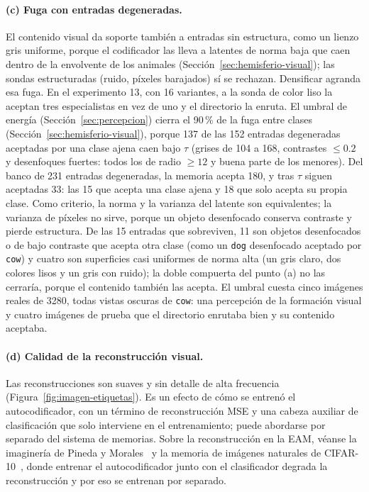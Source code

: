 \paragraph{(c) Fuga con entradas degeneradas.}
El contenido visual da soporte también a entradas sin estructura, como un lienzo gris
uniforme, porque el codificador las lleva a latentes de norma baja que caen dentro de la
envolvente de los animales (Sección~\ref{sec:hemisferio-visual}); las sondas
estructuradas (ruido, píxeles barajados) sí se rechazan.
Densificar agranda esa fuga.
En el experimento 13, con 16 variantes, a la sonda de color liso la aceptan tres
especialistas en vez de uno y el directorio la enruta.
El umbral de energía (Sección~\ref{sec:percepcion}) cierra el 90\,\% de la fuga entre
clases (Sección~\ref{sec:hemisferio-visual}), porque 137 de las 152 entradas
degeneradas aceptadas por una clase ajena caen bajo $\tau$ (grises de 104 a 168,
contrastes $\leq 0.2$ y desenfoques
fuertes: todos los de radio $\geq 12$ y buena parte de los menores).
Del banco de 231 entradas degeneradas, la memoria acepta 180, y tras $\tau$ siguen
aceptadas 33: las 15 que acepta una clase ajena y 18 que solo acepta su propia clase.
Como criterio, la norma y la varianza del latente son equivalentes; la varianza de
píxeles no sirve, porque un objeto desenfocado conserva contraste y pierde estructura.
De las 15 entradas que sobreviven, 11 son objetos desenfocados o de bajo contraste que
acepta otra clase (como un \texttt{dog} desenfocado aceptado por \texttt{cow}) y cuatro
son superficies casi uniformes de norma alta (un gris claro, dos colores lisos y un
gris con ruido); la doble compuerta del punto (a) no las cerraría, porque el contenido
también las acepta.
El umbral cuesta cinco imágenes reales de 3280, todas vistas oscuras de \texttt{cow}:
una percepción de la formación visual y cuatro imágenes de prueba que el directorio
enrutaba bien y su contenido aceptaba.

\paragraph{(d) Calidad de la reconstrucción visual.}
Las reconstrucciones son suaves y sin detalle de alta frecuencia
(Figura~\ref{fig:imagen-etiquetas}).
Es un efecto de cómo se entrenó el autocodificador, con un término de reconstrucción MSE y
una cabeza auxiliar de clasificación que solo interviene en el entrenamiento; puede
abordarse por separado del sistema de memorias.
Sobre la reconstrucción en la EAM, véanse la imaginería de Pineda y
Morales~\cite{pineda2023imagery} y la memoria de imágenes naturales de
CIFAR-10~\cite{hernandez2026cifar}, donde entrenar el autocodificador junto con el
clasificador degrada la reconstrucción y por eso se entrenan por separado.

